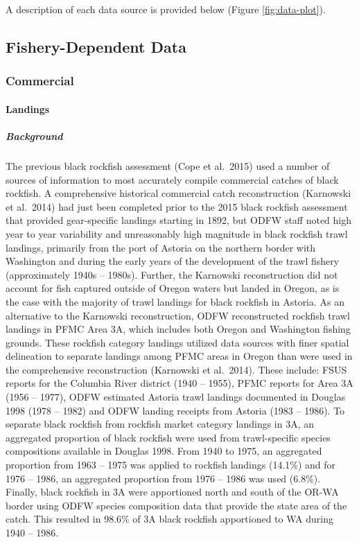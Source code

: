 \documentclass[11pt,
  english,
  letterpaper,
]{article}
\begin{document}
A description of each data source is provided below (Figure \ref{fig:data-plot}).

\hypertarget{fishery-dependent-data}{%
\subsection{Fishery-Dependent Data}\label{fishery-dependent-data}}

\hypertarget{commercial}{%
\subsubsection{Commercial}\label{commercial}}

\hypertarget{landings}{%
\paragraph{Landings}\label{landings}}

\hypertarget{background}{%
\subparagraph{Background}\label{background}}

The previous black rockfish assessment (Cope et al.~2015) used a number of sources of information to most accurately compile commercial catches of black rockfish. A comprehensive historical commercial catch reconstruction (Karnowski et al.~2014) had just been completed prior to the 2015 black rockfish assessment that provided gear-specific landings starting in 1892, but ODFW staff noted high year to year variability and unreasonably high magnitude in black rockfish trawl landings, primarily from the port of Astoria on the northern border with Washington and during the early years of the development of the trawl fishery (approximately 1940s -- 1980s). Further, the Karnowski reconstruction did not account for fish captured outside of Oregon waters but landed in Oregon, as is the case with the majority of trawl landings for black rockfish in Astoria. As an alternative to the Karnowski reconstruction, ODFW reconstructed rockfish trawl landings in PFMC Area 3A, which includes both Oregon and Washington fishing grounds. These rockfish category landings utilized data sources with finer spatial delineation to separate landings among PFMC areas in Oregon than were used in the comprehensive reconstruction (Karnowski et al.~2014). These include: FSUS reports for the Columbia River district (1940 -- 1955), PFMC reports for Area 3A (1956 -- 1977), ODFW estimated Astoria trawl landings documented in Douglas 1998 (1978 -- 1982) and ODFW landing receipts from Astoria (1983 -- 1986). To separate black rockfish from rockfish market category landings in 3A, an aggregated proportion of black rockfish were used from trawl-specific species compositions available in Douglas 1998. From 1940 to 1975, an aggregated proportion from 1963 -- 1975 was applied to rockfish landings (14.1\%) and for 1976 -- 1986, an aggregated proportion from 1976 -- 1986 was used (6.8\%). Finally, black rockfish in 3A were apportioned north and south of the OR-WA border using ODFW species composition data that provide the state area of the catch. This resulted in 98.6\% of 3A black rockfish apportioned to WA during 1940 -- 1986.
\end{document}
